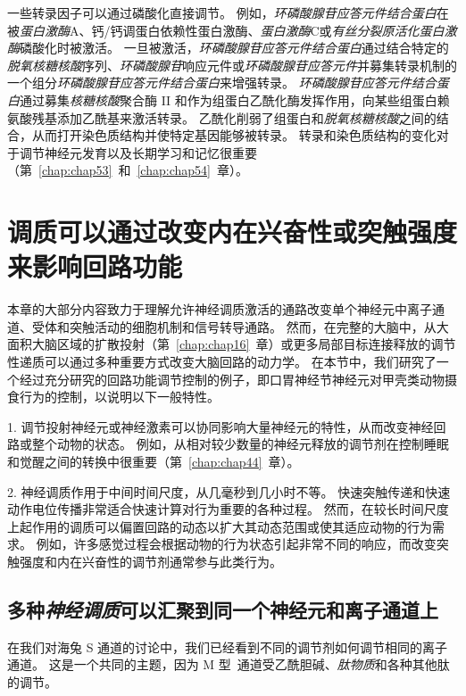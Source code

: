 一些转录因子可以通过磷酸化直接调节。
例如，\textit{环磷酸腺苷应答元件结合蛋白}在被\textit{蛋白激酶}A、钙/钙调蛋白依赖性蛋白激酶、\textit{蛋白激酶}C或\textit{有丝分裂原活化蛋白激酶}磷酸化时被激活。
一旦被激活，\textit{环磷酸腺苷应答元件结合蛋白}通过结合特定的\textit{脱氧核糖核酸}序列、\textit{环磷酸腺苷}响应元件或\textit{环磷酸腺苷应答元件}并募集转录机制的一个组分\textit{环磷酸腺苷应答元件结合蛋白}来增强转录。
\textit{环磷酸腺苷应答元件结合蛋白}通过募集\textit{核糖核酸}聚合酶 II 和作为组蛋白乙酰化酶发挥作用，向某些组蛋白赖氨酸残基添加乙酰基来激活转录。
乙酰化削弱了组蛋白和\textit{脱氧核糖核酸}之间的结合，从而打开染色质结构并使特定基因能够被转录。
转录和染色质结构的变化对于调节神经元发育以及长期学习和记忆很重要（第~\ref{chap:chap53}~和~\ref{chap:chap54}~章）。



\section{调质可以通过改变内在兴奋性或突触强度来影响回路功能}

本章的大部分内容致力于理解允许神经调质激活的通路改变单个神经元中离子通道、受体和突触活动的细胞机制和信号转导通路。
然而，在完整的大脑中，从大面积大脑区域的扩散投射（第~\ref{chap:chap16}~章）或更多局部目标连接释放的调节性递质可以通过多种重要方式改变大脑回路的动力学。
在本节中，我们研究了一个经过充分研究的回路功能调节控制的例子，即口胃神经节神经元对甲壳类动物摄食行为的控制，以说明以下一般特性。


1. 调节投射神经元或神经激素可以协同影响大量神经元的特性，从而改变神经回路或整个动物的状态。
例如，从相对较少数量的神经元释放的调节剂在控制睡眠和觉醒之间的转换中很重要（第~\ref{chap:chap44}~章）。


2. 神经调质作用于中间时间尺度，从几毫秒到几小时不等。
快速突触传递和快速动作电位传播非常适合快速计算对行为重要的各种过程。
然而，在较长时间尺度上起作用的调质可以偏置回路的动态以扩大其动态范围或使其适应动物的行为需求。
例如，许多感觉过程会根据动物的行为状态引起非常不同的响应，而改变突触强度和内在兴奋性的调节剂通常参与此类行为。



\subsection{多种\textit{神经调质}可以汇聚到同一个神经元和离子通道上}

在我们对海兔 S 通道的讨论中，我们已经看到不同的调节剂如何调节相同的离子通道。
这是一个共同的主题，因为 M 型~通道受乙酰胆碱、\textit{肽物质}和各种其他肽的调节。



